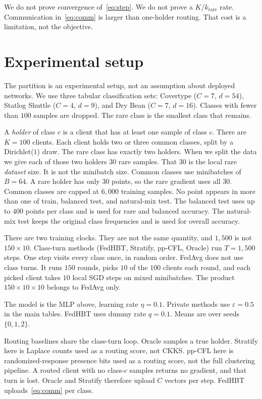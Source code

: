 \documentclass[11pt,a4paper]{article}
\theoremstyle{plain}
\begin{document}
We do not prove convergence of~\eqref{eq:step}. We do not prove a $K/k_{\mathrm{rare}}$ rate. Communication in~\eqref{eq:comm} is larger than one-holder routing. That cost is a limitation, not the objective.

\section{Experimental setup}

The partition is an experimental setup, not an assumption about deployed networks. We use three tabular classification sets: Covertype ($C{=}7$, $d{=}54$), Statlog Shuttle ($C{=}4$, $d{=}9$), and Dry Bean ($C{=}7$, $d{=}16$). Classes with fewer than $100$ samples are dropped. The rare class is the smallest class that remains.

A \emph{holder} of class $c$ is a client that has at least one sample of class $c$. There are $K{=}100$ clients. Each client holds two or three common classes, split by a Dirichlet($1$) draw. The rare class has exactly two holders. When we split the data we give each of those two holders $30$ rare samples. That $30$ is the local rare \emph{dataset} size. It is not the minibatch size. Common classes use minibatches of $B{=}64$. A rare holder has only $30$ points, so the rare gradient uses all $30$. Common classes are capped at $6{,}000$ training samples. No point appears in more than one of train, balanced test, and natural-mix test. The balanced test uses up to $400$ points per class and is used for rare and balanced accuracy. The natural-mix test keeps the original class frequencies and is used for overall accuracy.

There are two training clocks. They are not the same quantity, and $1{,}500$ is not $150\times 10$. Class-turn methods (FedHBT, Stratify, pp-CFL, Oracle) run $T{=}1{,}500$ steps. One step visits every class once, in random order. FedAvg does not use class turns. It runs $150$ rounds, picks $10$ of the $100$ clients each round, and each picked client takes $10$ local SGD steps on mixed minibatches. The product $150\times 10\times 10$ belongs to FedAvg only.

The model is the MLP above, learning rate $\eta{=}0.1$. Private methods use $\varepsilon{=}0.5$ in the main tables. FedHBT uses dummy rate $q{=}0.1$. Means are over seeds $\{0,1,2\}$.

Routing baselines share the class-turn loop. Oracle samples a true holder. Stratify here is Laplace counts used as a routing score, not CKKS. pp-CFL here is randomized-response presence bits used as a routing score, not the full clustering pipeline. A routed client with no class-$c$ samples returns no gradient, and that turn is lost. Oracle and Stratify therefore upload $C$ vectors per step. FedHBT uploads~\eqref{eq:comm} per class.
\end{document}
